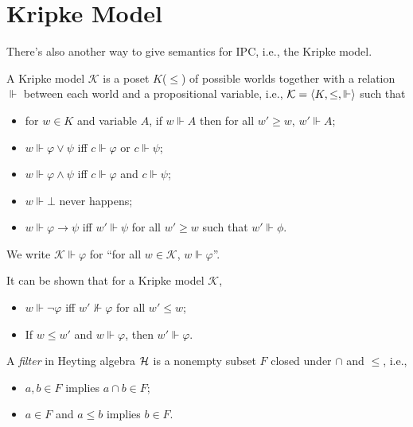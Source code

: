 \section{Kripke Model}
There's also another way to give semantics for IPC, i.e., the
Kripke model. 
\newcommand{\Kripke}{\mathcal{K}}
\begin{definition}
    A Kripke model $\Kripke$ is a poset $K$($\le$) of possible worlds 
    together with a relation $\Vdash$ between each world and a 
    propositional variable, i.e., $\Kripke=\angletuple{K,\le,\Vdash}$ 
    such that
    \begin{itemize}
        \item for $w\in K$ and variable $A$, if $w\Vdash A$ then for 
        all $w'\ge w$, $w'\Vdash A$;
        \item $w\Vdash \varphi\vee\psi$ iff $c\Vdash\varphi$ or $c\Vdash\psi$;
        \item $w\Vdash \varphi\wedge\psi$ iff $c\Vdash\varphi$ and $c\Vdash\psi$;
        \item $w\Vdash \bot$ never happens;
        \item $w\Vdash\varphi\to\psi$ iff $w'\Vdash\psi$ for all $w'\ge w$ such that $w'\Vdash\phi$.
    \end{itemize}
\end{definition}
We write $\Kripke\Vdash \varphi$ for ``for all $w\in\Kripke$, $w\Vdash\varphi$''.

\begin{lemma}
    It can be shown that for a Kripke model $\Kripke$,
    \begin{itemize}
        \item $w\Vdash\neg\varphi$ iff $w'\not\Vdash\varphi$ for all $w'\le w$;
        \item If $w\le w'$ and $w\Vdash\varphi$, then $w'\Vdash\varphi$.
    \end{itemize}
    \admitted
\end{lemma}

\begin{definition}
    A {\it filter} in Heyting algebra $\mathcal{H}$ is a nonempty subset $F$
    closed under $\cap$ and $\le$, i.e.,
    \begin{itemize}
        \item $a,b\in F$ implies $a\cap b\in F$;
        \item $a\in F$ and $a\le b$ implies $b\in F$. 
    \end{itemize}
\end{definition}

